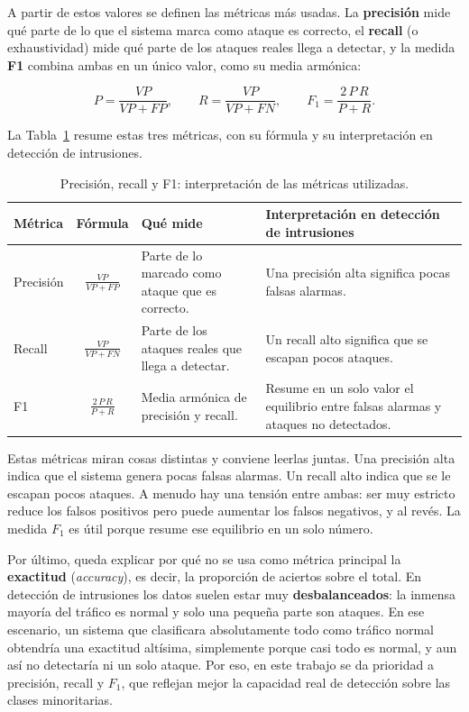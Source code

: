 A partir de estos valores se definen las métricas más usadas. La \textbf{precisión} mide qué parte de lo que el sistema marca como ataque es correcto, el \textbf{recall} (o exhaustividad) mide qué parte de los ataques reales llega a detectar, y la medida \textbf{F1} combina ambas en un único valor, como su media armónica:

\[
P = \frac{VP}{VP + FP}, \qquad
R = \frac{VP}{VP + FN}, \qquad
F_1 = \frac{2 \, P \, R}{P + R}.
\]

La Tabla~\ref{tab:metricas_prf1} resume estas tres métricas, con su fórmula y su interpretación en detección de intrusiones.

\begin{table}[!htbp]
\centering
\small
\begin{tabular}{|l|c|p{3.6cm}|p{4.6cm}|}
\hline
\textbf{Métrica} & \textbf{Fórmula} & \textbf{Qué mide} & \textbf{Interpretación en detección de intrusiones} \\
\hline
Precisión & $\frac{VP}{VP + FP}$ & Parte de lo marcado como ataque que es correcto. & Una precisión alta significa pocas falsas alarmas. \\
\hline
Recall & $\frac{VP}{VP + FN}$ & Parte de los ataques reales que llega a detectar. & Un recall alto significa que se escapan pocos ataques. \\
\hline
F1 & $\frac{2 \, P \, R}{P + R}$ & Media armónica de precisión y recall. & Resume en un solo valor el equilibrio entre falsas alarmas y ataques no detectados. \\
\hline
\end{tabular}
\caption{Precisión, recall y F1: interpretación de las métricas utilizadas.}
\label{tab:metricas_prf1}
\end{table}

Estas métricas miran cosas distintas y conviene leerlas juntas. Una precisión alta indica que el sistema genera pocas falsas alarmas. Un recall alto indica que se le escapan pocos ataques. A menudo hay una tensión entre ambas: ser muy estricto reduce los falsos positivos pero puede aumentar los falsos negativos, y al revés. La medida $F_1$ es útil porque resume ese equilibrio en un solo número.

Por último, queda explicar por qué no se usa como métrica principal la \textbf{exactitud} (\emph{accuracy}), es decir, la proporción de aciertos sobre el total. En detección de intrusiones los datos suelen estar muy \textbf{desbalanceados}: la inmensa mayoría del tráfico es normal y solo una pequeña parte son ataques. En ese escenario, un sistema que clasificara absolutamente todo como tráfico normal obtendría una exactitud altísima, simplemente porque casi todo es normal, y aun así no detectaría ni un solo ataque. Por eso, en este trabajo se da prioridad a precisión, recall y $F_1$, que reflejan mejor la capacidad real de detección sobre las clases minoritarias.
